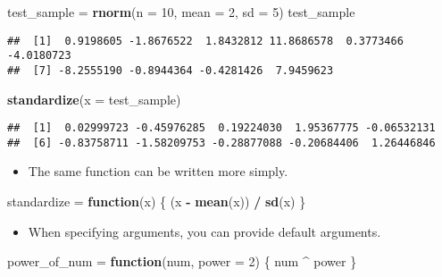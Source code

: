 \documentclass[]{book}
\newenvironment{Shaded}{\begin{snugshade}}{\end{snugshade}}
\newcommand{\KeywordTok}[1]{\textcolor[rgb]{0.13,0.29,0.53}{\textbf{#1}}}
\newcommand{\DataTypeTok}[1]{\textcolor[rgb]{0.13,0.29,0.53}{#1}}
\newcommand{\DecValTok}[1]{\textcolor[rgb]{0.00,0.00,0.81}{#1}}
\newcommand{\StringTok}[1]{\textcolor[rgb]{0.31,0.60,0.02}{#1}}
\newcommand{\ControlFlowTok}[1]{\textcolor[rgb]{0.13,0.29,0.53}{\textbf{#1}}}
\newcommand{\OperatorTok}[1]{\textcolor[rgb]{0.81,0.36,0.00}{\textbf{#1}}}
\newcommand{\NormalTok}[1]{#1}
\providecommand{\tightlist}{%
  \setlength{\itemsep}{0pt}\setlength{\parskip}{0pt}}
\begin{document}
\begin{Shaded}
\begin{Highlighting}[]
\NormalTok{test_sample =}\StringTok{ }\KeywordTok{rnorm}\NormalTok{(}\DataTypeTok{n =} \DecValTok{10}\NormalTok{, }\DataTypeTok{mean =} \DecValTok{2}\NormalTok{, }\DataTypeTok{sd =} \DecValTok{5}\NormalTok{)}
\NormalTok{test_sample}
\end{Highlighting}
\end{Shaded}

\begin{verbatim}
##  [1]  0.9198605 -1.8676522  1.8432812 11.8686578  0.3773466 -4.0180723
##  [7] -8.2555190 -0.8944364 -0.4281426  7.9459623
\end{verbatim}

\begin{Shaded}
\begin{Highlighting}[]
\KeywordTok{standardize}\NormalTok{(}\DataTypeTok{x =}\NormalTok{ test_sample)}
\end{Highlighting}
\end{Shaded}

\begin{verbatim}
##  [1]  0.02999723 -0.45976285  0.19224030  1.95367775 -0.06532131
##  [6] -0.83758711 -1.58209753 -0.28877088 -0.20684406  1.26446846
\end{verbatim}

\begin{itemize}
\tightlist
\item
  The same function can be written more simply.
\end{itemize}

\begin{Shaded}
\begin{Highlighting}[]
\NormalTok{standardize =}\StringTok{ }\ControlFlowTok{function}\NormalTok{(x) \{}
\NormalTok{  (x }\OperatorTok{-}\StringTok{ }\KeywordTok{mean}\NormalTok{(x)) }\OperatorTok{/}\StringTok{ }\KeywordTok{sd}\NormalTok{(x)}
\NormalTok{\}}
\end{Highlighting}
\end{Shaded}

\begin{itemize}
\tightlist
\item
  When specifying arguments, you can provide default arguments.
\end{itemize}

\begin{Shaded}
\begin{Highlighting}[]
\NormalTok{power_of_num =}\StringTok{ }\ControlFlowTok{function}\NormalTok{(num, }\DataTypeTok{power =} \DecValTok{2}\NormalTok{) \{}
\NormalTok{  num }\OperatorTok{^}\StringTok{ }\NormalTok{power}
\NormalTok{\}}
\end{Highlighting}
\end{Shaded}
\end{document}
